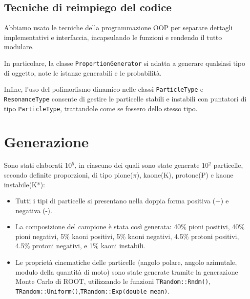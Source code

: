 \documentclass[12pt, a4paper]{article}
\begin{document}
\subsection{Tecniche di reimpiego del codice}
Abbiamo usato le tecniche della programmazione OOP per separare dettagli implementativi e interfaccia, incapsulando le funzioni e rendendo il tutto modulare.
\newline

In particolare, la classe \verb!ProportionGenerator! si adatta a generare qualsiasi tipo di oggetto, note le istanze generabili e le probabilità.
\newline

Infine, l'uso del polimorfismo dinamico nelle classi \verb!ParticleType! e \verb!ResonanceType! consente di gestire le particelle stabili e instabili con puntatori di tipo \verb!ParticleType!, trattandole come se fossero dello stesso tipo.

\section{Generazione}

Sono stati elaborati 10$^5$, in ciascuno dei quali sono state generate 10$^2$ particelle, secondo definite proporzioni, di tipo pione($\pi$), kaone(K), protone(P) e kaone instabile(K*):

\begin{itemize}

\item Tutti i tipi di particelle si presentano nella doppia forma positiva (+) e negativa (-). 

\item La composizione del campione è stata così generata: 40\% pioni positivi, 40\% pioni negativi, 5\% kaoni positivi, 5\% kaoni negativi, 4.5\% protoni positivi, 4.5\% protoni negativi, e 1\% kaoni instabili.

\item Le proprietà cinematiche delle particelle (angolo polare, angolo azimutale, modulo della quantità di moto) sono state generate tramite la generazione Monte Carlo di ROOT, utilizzando le funzioni \verb!TRandom::Rndm()!, 
\verb!TRandom::Uniform()!,\verb!TRandom::Exp(double mean)!.

\end{itemize}
\end{document}
